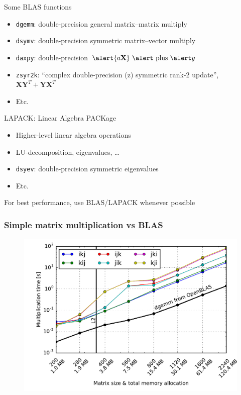 \documentclass[usenames,dvipsnames,mathserif,compress]{beamer}
\begin{document}
\begin{frame}
  \begin{block}{Some BLAS functions}
    \begin{itemize}
    \item \texttt{dgemm}: \alert double-precision \alert{ge}neral \alert matrix--\alert matrix multiply
    \item \texttt{dsymv}: \alert double-precision \alert{sy}mmetric \alert matrix--\alert vector multiply
    \item \texttt{daxpy}: \alert double-precision $\alert{a \mathbf X}\textrm{ \alert plus } \alert y$
    \item \texttt{zsyr2k}: ``complex double-precision (\alert z) \alert{sy}mmetric \alert ran\alert{k-2} update'',
      $\mathbf X \mathbf Y^T + \mathbf Y \mathbf X^T$
    \item Etc.
    \end{itemize}
  \end{block}
  \begin{block}{LAPACK: Linear Algebra PACKage}
    \begin{itemize}
    \item Higher-level linear algebra operations
    \item LU-decomposition, eigenvalues, \ldots
    \item \texttt{dsyev}: \alert double-precision \alert{sy}mmetric \alert eigen{\alert v}alues
    \item Etc.
    \end{itemize}
  \end{block}
  For best performance, use BLAS/LAPACK whenever possible
\end{frame}

\begin{frame}
  \frametitle{Simple matrix multiplication vs BLAS}
  \begin{figure}
    \includegraphics[width=.95\textwidth]{code/timings-matmul-blas.pdf}
  \end{figure}
\end{frame}
\end{document}
